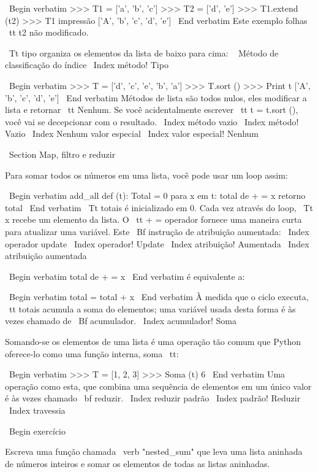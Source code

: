 \documentclass[10pt]{book}
\begin{document}
{{{{{{\ Begin {verbatim}
>>> T1 = ['a', 'b', 'c']
>>> T2 = ['d', 'e']
>>> T1.extend (t2)
>>> T1 impressão
['A', 'b', 'c', 'd', 'e']
\ End {verbatim}
%
Este exemplo folhas {\ tt} t2 não modificado.

{\ Tt tipo} organiza os elementos da lista de baixo para cima:
\ {} Método de classificação do índice
\ Index {método! Tipo}

\ Begin {verbatim}
>>> T = ['d', 'c', 'e', ​​'b', 'a']
>>> T.sort ()
>>> Print t
['A', 'b', 'c', 'd', 'e']
\ End {verbatim}
%
Métodos de lista são todos nulos, eles modificar a lista e retornar {\ tt Nenhum}.
Se você acidentalmente escrever {\ tt t = t.sort ()}, você vai se decepcionar
com o resultado.
\ Index {método vazio}
\ Index {método! Vazio}
\ Index {Nenhum valor especial}
\ Index {valor especial! Nenhum}


\ Section {Map, filtro e reduzir}

Para somar todos os números em uma lista, você pode usar um loop assim:


\ Begin {verbatim}
add_all def (t):
    Total = 0
    para x em t:
        total de + = x
    retorno total
\ End {verbatim}
%
{\ Tt totais} é inicializado em 0. Cada vez através do loop,
{\ Tt x} recebe um elemento da lista. O {\ tt + = operador}
fornece uma maneira curta para atualizar uma variável. Este
{\ Bf instrução de atribuição aumentada}:
\ Index {operador update}
\ Index {operador! Update}
\ Index {atribuição! Aumentada}
\ Index {atribuição aumentada}

\ Begin {verbatim}
    total de + = x
\ End {verbatim}
%
é equivalente a:

\ Begin {verbatim}
    total = total + x
\ End {verbatim}
%
À medida que o ciclo executa, {\ tt totais} acumula a soma do
elementos; uma variável usada desta forma é às vezes chamado de
{\ Bf acumulador}.
\ Index {acumulador! Soma}

Somando-se os elementos de uma lista é uma operação tão comum
que Python oferece-lo como uma função interna, {soma \ tt}:

\ Begin {verbatim}
>>> T = [1, 2, 3]
>>> Soma (t)
6
\ End {verbatim}
%
Uma operação como esta, que combina uma sequência de elementos em
um único valor é às vezes chamado {\ bf reduzir}.
\ Index {reduzir padrão}
\ Index {padrão! Reduzir}
\ Index {travessia}

\ Begin {} exercício

Escreva uma função chamada \ verb "nested_sum" que leva uma lista aninhada
de números inteiros e somar os elementos de todas as listas aninhadas.

}}}}}}
\end{document}
